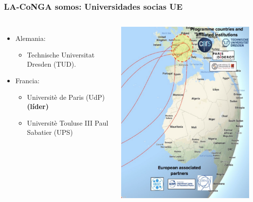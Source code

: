 \begin{frame}[fragile]
\frametitle{LA-CoNGA somos: Universidades socias UE}
\begin{columns}[c] %

\begin{itemize}
	\item Alemania:
	\begin{itemize}
		\item Technische Universitat Dresden (TUD).
		\end{itemize}
	\item Francia:
	\begin{itemize}
		\item Universitè de Paris (UdP) {\bf (líder)}
		\item Universitè Touluse III Paul Sabatier (UPS)
		\end{itemize}
\end{itemize}

\begin{center}
\includegraphics[scale=0.5]{imagenes/mapaColab_2.png}
\end{center}

\end{columns}
\end{frame}


